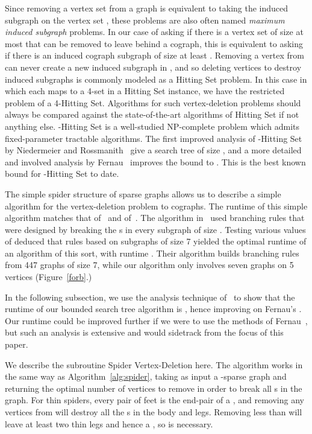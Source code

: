 \documentclass{llncs}
\begin{document}
Since removing a vertex set  from a graph  is equivalent to taking the induced subgraph on the vertex set , these problems are also often named \emph{maximum induced subgraph} problems. In our case of asking if there is a vertex set of size at most  that can be removed to leave behind a cograph, this is equivalent to asking if there is an induced cograph subgraph of size at least . Removing a vertex from  can never create a new induced subgraph in , and so deleting vertices to destroy induced subgraphs is commonly modeled as a {\sc Hitting Set} problem. In this case in which each  maps to a 4-set in a {\sc Hitting Set} instance, we have the restricted problem of a 4-{\sc Hitting Set}. Algorithms for such vertex-deletion problems should always be compared against the state-of-the-art algorithms of {\sc Hitting Set} if not anything else. -{\sc Hitting Set} is a well-studied NP-complete problem which admits fixed-parameter tractable algorithms. The first improved analysis of -{\sc Hitting Set} by Niedermeier and Rossmanith~\cite{NiRo} give a search tree of size , and a more detailed and involved analysis by Fernau~\cite{Fer} improves the bound to . This is the best known bound for -{\sc Hitting Set} to date.

The simple spider structure of  sparse graphs allows us to describe a simple algorithm for the vertex-deletion problem to cographs. The runtime of this simple algorithm matches that of~\cite{GGHN} and of~\cite{NiRo}. The algorithm in~\cite{GGHN} used branching rules that were designed by breaking the s in every subgraph of size . Testing various values of  deduced that rules based on subgraphs of size 7 yielded the optimal runtime of an algorithm of this sort, with runtime . Their algorithm builds branching rules from 447 graphs of size 7, while our algorithm only involves seven graphs on 5 vertices (Figure~\ref{forb}.)

In the following subsection, we use the analysis technique of~\cite{NiRo} to show that the runtime of our bounded search tree algorithm is , hence improving on Fernau's . Our runtime could be improved further if we were to use the methods of Fernau~\cite{Fer}, but such an analysis is extensive and would sidetrack from the focus of this paper.

We describe the subroutine {\sc Spider Vertex-Deletion} here. The algorithm works in the same way as Algorithm~\ref{alg:spider}, taking as input a -sparse graph and returning the optimal number of vertices to remove in order to break all s in the graph. For thin spiders, every pair of feet is the end-pair of a , and removing any  vertices from  will destroy all the s in the body and legs. Removing less than  will leave at least two thin legs and hence a , so  is necessary.
\end{document}
